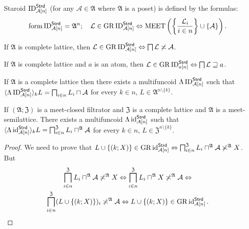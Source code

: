\begin{defn}
Staroid $\operatorname{ID}_{\mathcal{A}[n]}^{\mathsf{Strd}}$ (for any $\mathcal{A}\in\mathfrak{A}$
where $\mathfrak{A}$ is a poset) is defined by the formulas:
\[
\operatorname{form}\operatorname{ID}_{\mathcal{A}[n]}^{\mathsf{Strd}}=\mathfrak{A}^{n};\quad\mathcal{L}\in\operatorname{GR}\operatorname{ID}_{\mathcal{A}[n]}^{\mathsf{Strd}}\Leftrightarrow\operatorname{MEET}\left(\left\{ \frac{\mathcal{L}_{i}}{i\in n}\right\}\cup\{\mathcal{A}\}\right).
\]
\end{defn}
\begin{obvious}
If $\mathfrak{A}$ is complete lattice,
then $\mathcal{L}\in\operatorname{GR}\operatorname{ID}_{\mathcal{A}[n]}^{\mathsf{Strd}}\Leftrightarrow\bigsqcap\mathcal{L}\not\asymp\mathcal{A}$.
\end{obvious}

\begin{obvious}
If $\mathfrak{A}$ is complete lattice and $a$ is an atom, then $\mathcal{L}\in\operatorname{GR}\operatorname{ID}_{a[n]}^{\mathsf{Strd}}\Leftrightarrow\bigsqcap\mathcal{L}\sqsupseteq a$.
\end{obvious}

\begin{obvious}
If $\mathfrak{A}$ is a complete lattice then there exists a multifuncoid
$\Lambda\operatorname{ID}_{\mathcal{A}[n]}^{\mathsf{Strd}}$ such that $\langle\Lambda\operatorname{ID}_{\mathcal{A}[n]}^{\mathsf{Strd}}\rangle_{k}L=\bigsqcap_{i\in n}L_{i}\sqcap\mathcal{A}$
for every $k\in n$, $L\in\mathfrak{A}^{n\setminus\{k\}}$.\end{obvious}
\begin{prop}
If $(\mathfrak{A};\mathfrak{Z})$ is a meet-closed filtrator and $\mathfrak{Z}$
is a complete lattice and $\mathfrak{A}$ is a meet-semilattice. There
exists a multifuncoid $\Lambda\operatorname{id}_{\mathcal{A}[n]}^{\mathsf{Strd}}$
such that $\langle\Lambda\operatorname{id}_{\mathcal{A}[n]}^{\mathsf{Strd}}\rangle_{k}L=\bigsqcap_{i\in n}^{\mathfrak{Z}}L_{i}\sqcap^{\mathfrak{A}}\mathcal{A}$
for every $k\in n$, $L\in\mathfrak{Z}^{n\setminus\{k\}}$.\end{prop}
\begin{proof}
We need to prove that $L\cup\{(k;X)\}\in\operatorname{GR}\operatorname{id}_{\mathcal{A}[n]}^{\mathsf{Strd}}\Leftrightarrow\bigsqcap_{i\in n}^{\mathfrak{Z}}L_{i}\sqcap^{\mathfrak{A}}\mathcal{A}\not\asymp^{\mathfrak{A}}X$.
But
\begin{multline*}
\bigsqcap_{i\in n}^{\mathfrak{Z}}L_{i}\sqcap^{\mathfrak{A}}\mathcal{A}\not\asymp^{\mathfrak{A}}X\Leftrightarrow\bigsqcap_{i\in n}^{\mathfrak{Z}}L_{i}\sqcap^{\mathfrak{A}}X\not\asymp^{\mathfrak{A}}\mathcal{A}\Leftrightarrow\\
\bigsqcap_{i\in n}^{\mathfrak{Z}}(L\cup\{(k;X)\})_{i}\not\asymp^{\mathfrak{A}}\mathcal{A}\Leftrightarrow L\cup\{(k;X)\}\in\operatorname{GR}\operatorname{id}_{\mathcal{A}[n]}^{\mathsf{Strd}}.
\end{multline*}

\end{proof}


